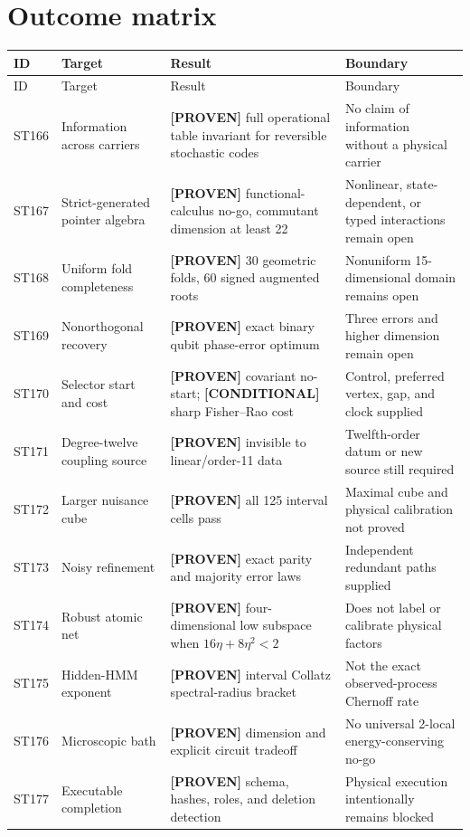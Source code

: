 \documentclass[11pt,a4paper]{article}
\newcommand{\proven}{\textcolor{green!40!black}{\textbf{[PROVEN]}}}
\newcommand{\conditional}{\textcolor{violet!65!black}{\textbf{[CONDITIONAL]}}}
\begin{document}
\section{Outcome matrix}
\small
\begin{longtable}{@{}p{}p{}p{}p{}@{}}
\toprule ID & Target & Result & Boundary\\\midrule\endfirsthead
\toprule ID & Target & Result & Boundary\\\midrule\endhead
ST166 & Information across carriers & \proven{} full operational table invariant for reversible stochastic codes & No claim of information without a physical carrier\\
ST167 & Strict-generated pointer algebra & \proven{} functional-calculus no-go, commutant dimension at least 22 & Nonlinear, state-dependent, or typed interactions remain open\\
ST168 & Uniform fold completeness & \proven{} 30 geometric folds, 60 signed augmented roots & Nonuniform 15-dimensional domain remains open\\
ST169 & Nonorthogonal recovery & \proven{} exact binary qubit phase-error optimum & Three errors and higher dimension remain open\\
ST170 & Selector start and cost & \proven{} covariant no-start; \conditional{} sharp Fisher--Rao cost & Control, preferred vertex, gap, and clock supplied\\
ST171 & Degree-twelve coupling source & \proven{} invisible to linear/order-11 data & Twelfth-order datum or new source still required\\
ST172 & Larger nuisance cube & \proven{} all 125 interval cells pass & Maximal cube and physical calibration not proved\\
ST173 & Noisy refinement & \proven{} exact parity and majority error laws & Independent redundant paths supplied\\
ST174 & Robust atomic net & \proven{} four-dimensional low subspace when $16\eta+8\eta^2<2$ & Does not label or calibrate physical factors\\
ST175 & Hidden-HMM exponent & \proven{} interval Collatz spectral-radius bracket & Not the exact observed-process Chernoff rate\\
ST176 & Microscopic bath & \proven{} dimension and explicit circuit tradeoff & No universal 2-local energy-conserving no-go\\
ST177 & Executable completion & \proven{} schema, hashes, roles, and deletion detection & Physical execution intentionally remains blocked\\
\bottomrule
\end{longtable}
\normalsize
\end{document}
